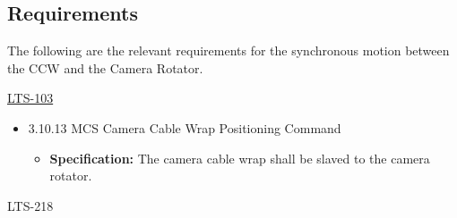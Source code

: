 \documentclass[SE,lsstdraft,authoryear,toc]{lsstdoc}
\begin{document}
\hypertarget{requirements}{%
\subsection{Requirements}\label{requirements}}

The following are the relevant requirements for the synchronous motion
between the CCW and the Camera Rotator.

\underline{LTS-103}

\begin{itemize}
\item
  3.10.13 MCS Camera Cable Wrap Positioning Command

  \begin{itemize}
  \item
    \textbf{Specification:} The camera cable wrap shall be slaved to the
    camera rotator.
  \end{itemize}
\end{itemize}

LTS-218
\end{document}
